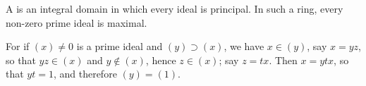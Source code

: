 \begin{eg}
A  is an integral domain in which every ideal is principal. In such a ring, every non-zero prime ideal is maximal.

For if \( (x) \ne 0 \) is a prime ideal and \( (y) \supset (x) \), we have \( x \in (y) \), say \( x = yz \), so that \( yz \in (x) \) and \( y \notin (x) \), hence \( z \in (x) \); say \( z = tx \). Then \( x = ytx \), so that \( yt = 1 \), and therefore \( (y) = (1) \).
\end{eg}



        
        

        
        
    


